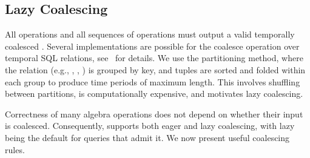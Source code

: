 \subsection{Lazy Coalescing}
\label{sec:sys:coal}


All operations and all sequences of operations must output a valid
temporally coalesced \tg.  Several implementations are possible for
the coalesce operation over temporal SQL relations,
see~\cite{DBLP:conf/vldb/BohlenSS96} for details.  We use the
partitioning method, where the relation (e.g., \tv, \te, \trg) is
grouped by key, and tuples are sorted and folded within each group to
produce time periods of maximum length.  This involves shuffling
between partitions, is computationally expensive, and motivates
lazy coalescing.

Correctness of many \tg algebra operations does not depend on whether
their input is coalesced.  Consequently, \ql supports both eager and
lazy coalescing, with lazy being the default for queries that admit
it.  We now present useful coalescing rules.

%

